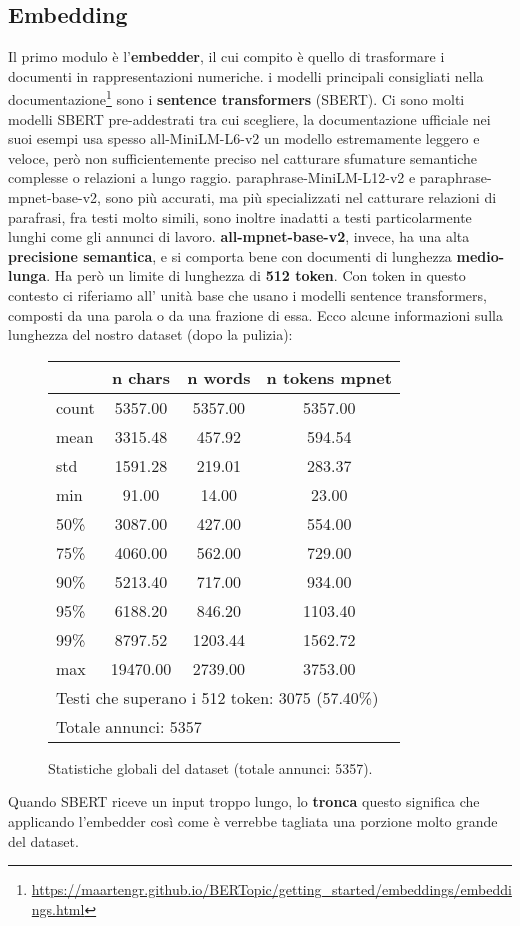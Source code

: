 \subsection{Embedding}
Il primo modulo è l'\textbf{embedder}, il cui compito è quello di trasformare i documenti in rappresentazioni numeriche.
i modelli principali consigliati nella documentazione\footnote{\url{https://maartengr.github.io/BERTopic/getting_started/embeddings/embeddings.html}} sono i \textbf{sentence transformers} (SBERT).
Ci sono molti modelli SBERT pre-addestrati tra cui scegliere, la documentazione ufficiale nei suoi esempi usa spesso all-MiniLM-L6-v2 un modello estremamente leggero e veloce, però non sufficientemente preciso nel catturare sfumature semantiche complesse o relazioni a lungo raggio.
paraphrase-MiniLM-L12-v2 e paraphrase-mpnet-base-v2, sono più accurati, ma più specializzati nel catturare relazioni di parafrasi, fra testi molto simili, sono inoltre inadatti a testi particolarmente lunghi come gli annunci di lavoro.
\textbf{all-mpnet-base-v2}, invece, ha una alta \textbf{precisione semantica}, e si comporta bene con documenti di lunghezza \textbf{medio-lunga}.
Ha però un limite di lunghezza di \textbf{512 token}. Con token in questo contesto ci riferiamo all' unità base che usano i modelli sentence transformers, composti da una parola o da una frazione di essa.
Ecco alcune informazioni sulla lunghezza del nostro dataset (dopo la pulizia):
\begin{figure}[H]
\centering
\scriptsize
\begin{tabular}{lccc}
\hline
 & n chars & n words & n tokens mpnet \\
\hline
count & 5357.00 & 5357.00 & 5357.00 \\
mean & 3315.48 & 457.92 & 594.54 \\
std & 1591.28 & 219.01 & 283.37 \\
min & 91.00 & 14.00 & 23.00 \\
50\% & 3087.00 & 427.00 & 554.00 \\
75\% & 4060.00 & 562.00 & 729.00 \\
90\% & 5213.40 & 717.00 & 934.00 \\
95\% & 6188.20 & 846.20 & 1103.40 \\
99\% & 8797.52 & 1203.44 & 1562.72 \\
max & 19470.00 & 2739.00 & 3753.00 \\
\hline
\multicolumn{4}{l}{Testi che superano i 512 token: 3075 (57.40\%)} \\
\multicolumn{4}{l}{Totale annunci: 5357} \\
\hline
\end{tabular}
\caption{Statistiche globali del dataset (totale annunci: 5357).}
\label{fig:dataset-stats}
\end{figure}
\noindent Quando SBERT riceve un input troppo lungo, lo \textbf{tronca} questo significa che applicando l'embedder così come è verrebbe tagliata una porzione molto grande del dataset.

